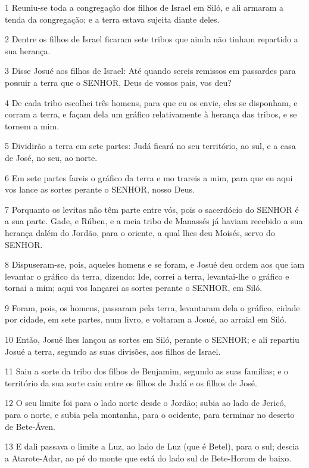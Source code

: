 \par 1 Reuniu-se toda a congregação dos filhos de Israel em Siló, e ali armaram a tenda da congregação; e a terra estava sujeita diante deles.
\par 2 Dentre os filhos de Israel ficaram sete tribos que ainda não tinham repartido a sua herança.
\par 3 Disse Josué aos filhos de Israel: Até quando sereis remissos em passardes para possuir a terra que o SENHOR, Deus de vossos pais, vos deu?
\par 4 De cada tribo escolhei três homens, para que eu os envie, eles se disponham, e corram a terra, e façam dela um gráfico relativamente à herança das tribos, e se tornem a mim.
\par 5 Dividirão a terra em sete partes: Judá ficará no seu território, ao sul, e a casa de José, no seu, ao norte.
\par 6 Em sete partes fareis o gráfico da terra e mo trareis a mim, para que eu aqui vos lance as sortes perante o SENHOR, nosso Deus.
\par 7 Porquanto os levitas não têm parte entre vós, pois o sacerdócio do SENHOR é a sua parte. Gade, e Rúben, e a meia tribo de Manassés já haviam recebido a sua herança dalém do Jordão, para o oriente, a qual lhes deu Moisés, servo do SENHOR.
\par 8 Dispuseram-se, pois, aqueles homens e se foram, e Josué deu ordem aos que iam levantar o gráfico da terra, dizendo: Ide, correi a terra, levantai-lhe o gráfico e tornai a mim; aqui vos lançarei as sortes perante o SENHOR, em Siló.
\par 9 Foram, pois, os homens, passaram pela terra, levantaram dela o gráfico, cidade por cidade, em sete partes, num livro, e voltaram a Josué, ao arraial em Siló.
\par 10 Então, Josué lhes lançou as sortes em Siló, perante o SENHOR; e ali repartiu Josué a terra, segundo as suas divisões, aos filhos de Israel.
\par 11 Saiu a sorte da tribo dos filhos de Benjamim, segundo as suas famílias; e o território da sua sorte caiu entre os filhos de Judá e os filhos de José.
\par 12 O seu limite foi para o lado norte desde o Jordão; subia ao lado de Jericó, para o norte, e subia pela montanha, para o ocidente, para terminar no deserto de Bete-Áven.
\par 13 E dali passava o limite a Luz, ao lado de Luz (que é Betel), para o sul; descia a Atarote-Adar, ao pé do monte que está do lado sul de Bete-Horom de baixo.
